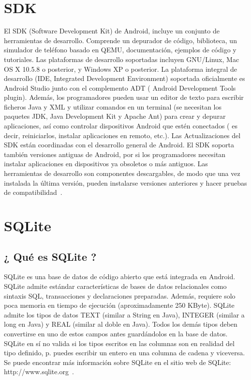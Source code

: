 \section{SDK}
El SDK (Software Development Kit) de Android, incluye un conjunto de herramientas de desarrollo. Comprende un depurador de código, biblioteca, un simulador de teléfono basado en QEMU, documentación, ejemplos de código y tutoriales. Las plataformas de desarrollo soportadas incluyen GNU/Linux, Mac OS X 10.5.8 o posterior, y Windows XP o posterior. La plataforma integral de desarrollo (IDE, Integrated Development Environment) soportada oficialmente es Android Studio junto con el complemento ADT ( Android Development Tools plugin). Además, los programadores pueden usar un editor de texto para escribir ficheros Java y XML y utilizar comandos en un terminal (se necesitan los paquetes JDK, Java Development Kit y Apache Ant) para crear y depurar aplicaciones, así como controlar dispositivos Android que estén conectados ( es decir, reiniciarlos, instalar aplicaciones en remoto, etc.). 
Las Actualizaciones del SDK están coordinadas con el desarrollo general de Android. El SDK soporta también versiones antiguas de Android, por si los programadores necesitan instalar aplicaciones en dispositivos ya obsoletos o más antiguos. Las herramientas de desarrollo son componentes descargables, de modo que una vez instalada la última versión, pueden instalarse versiones anteriores y hacer pruebas de compatibilidad~\cite{wiki:androidsdk}. 

\section{SQLite}
\subsection{¿ Qué es SQLite ?}
SQLite es una base de datos de código abierto que está integrada en Android. SQLite admite estándar características de bases de datos relacionales como sintaxis SQL, transacciones y declaraciones preparadas. Además, requiere solo poca memoria en tiempo de ejecución (aproximadamente 250 KByte). SQLite admite los tipos de datos TEXT (similar a String en Java), INTEGER (similar a long en Java) y REAL (similar al doble en Java). Todos los demás tipos deben convertirse en uno de estos campos antes guardándolos en la base de datos. SQLite en sí no valida si los tipos escritos en las columnas son en realidad del tipo definido, p. puedes escribir un entero en una columna de cadena y viceversa. Se puede encontrar más información sobre SQLite en el sitio web de SQLite: http://www.sqlite.org~\cite{vogel2010android}.
